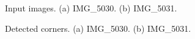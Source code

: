 \documentclass{../../assignment}
\begin{document}
\begin{problemlist}
\begin{enumerate}
\begin{figure}[H]
{}
\caption{Input images. (a) IMG\_5030. (b) IMG\_5031.}
\label{fig:images}
\end{figure}
 
\begin{figure}[H]
\caption{Detected corners. (a) IMG\_5030. (b) IMG\_5031.}
\label{fig:images}
\end{figure} 




\end{enumerate}
\end{problemlist}
\end{document}
